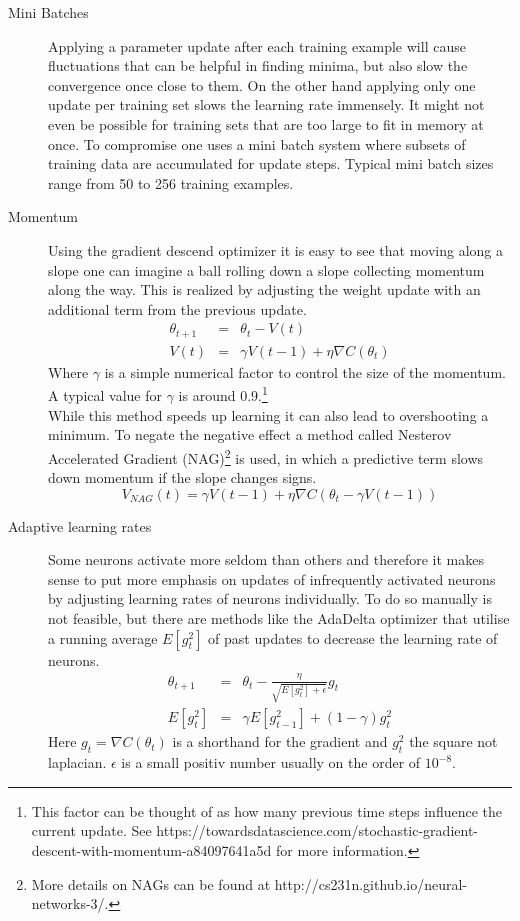 				\begin{description}
					\item[Mini Batches] Applying a parameter update after each training example will cause fluctuations that can be helpful in finding minima, but also slow the convergence once close to them. On the other hand applying only one update per training set slows the learning rate immensely. It might not even be possible for training sets that are too large to fit in memory at once. To compromise one uses a mini batch system where subsets of training data are accumulated for update steps. Typical mini batch sizes range from 50 to 256 training examples.
					\item[Momentum] Using the gradient descend optimizer it is easy to see that moving along a slope one can imagine a ball rolling down a slope collecting momentum along the way. This is realized by adjusting the weight update with an additional term from the previous update.
					\begin{eqnarray}
						\theta_{t+1} & = & \theta_t - V(t)\\
						V(t) & = & \gamma V(t-1)  + \eta \nabla C(\theta_{t})
					\end{eqnarray}
					Where $\gamma$ is a simple numerical factor to control the size of the momentum. A typical value for $\gamma$ is around $0.9$.\footnote{This factor can be thought of as how many previous time steps influence the current update. See https://towardsdatascience.com/stochastic-gradient-descent-with-momentum-a84097641a5d for more information.}\\
					While this method speeds up learning  it can also lead to overshooting a minimum. To negate the negative effect a method called Nesterov Accelerated Gradient (NAG)\footnote{More details on NAGs can be found at http://cs231n.github.io/neural-networks-3/.} is used, in which a predictive term slows down momentum if the slope changes signs.
					\begin{equation}
						V_{NAG}(t) = \gamma V(t-1) + \eta \nabla C( \theta_t - \gamma V(t-1))
					\end{equation} 
					\item[Adaptive learning rates] Some neurons activate more seldom than others and therefore it makes sense to put more emphasis on updates of infrequently activated neurons by adjusting learning rates of neurons individually. To do so manually is not feasible, but there are methods like the AdaDelta optimizer that utilise a running average $E[g^2_t]$ of past updates to decrease the learning rate of neurons.
					\begin{eqnarray}
					\theta_{t+1} & = & \theta_t - \frac{\eta}{\sqrt{E[g^2_t]+\epsilon}}g_t \\
					E[g^2_t] & = & \gamma E[g^2_{t-1}] + (1-\gamma) g^2_t
					\end{eqnarray}
					Here $g_t = \nabla C(\theta_t)$ is a shorthand for the gradient and $g^2_t$ the square not laplacian. $\epsilon$ is a small positiv number usually on the order of $10^{-8}$.
				\end{description}
